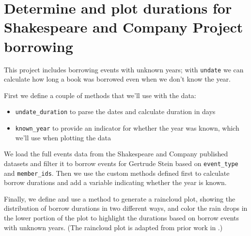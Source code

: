 \documentclass[final]{anthology-ch} %
\begin{document}
\section{Determine and plot durations for Shakespeare and Company Project borrowing}\label{appdx:shxco-duration-raincloud}

This project includes borrowing events with unknown years; with \texttt{undate} we can calculate how long a book was borrowed even when we don't know the year. 

First we define a couple of methods that we'll use with the data:
\begin{itemize}
    \item \texttt{undate\_duration} to parse the dates and calculate duration in days
    \item \texttt{known\_year} to provide an indicator for whether the year was known, which we'll use when plotting the data
\end{itemize}

We load the full events data from the Shakespeare and Company published datasets \cite{koeser_shakespeare_2025} and filter it to borrow events for Gertrude Stein based on \texttt{event\_type} and \texttt{member\_ids}.  Then we use the custom methods defined first to calculate borrow durations and add a variable indicating whether the year is known.

Finally, we define and use a method to generate a raincloud plot, showing the distribution of borrow durations in two different ways, and color the rain drops in the lower portion of the plot to highlight the durations based on borrow events with unknown years. (The raincloud plot is adapted from prior work in \cite{koeser_missing_2024}.)
\end{document}
